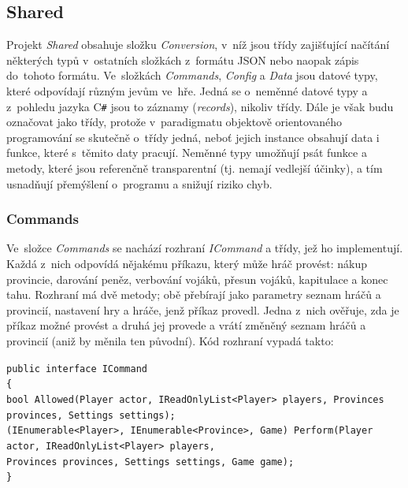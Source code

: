 \documentclass[a4paper,12pt]{article}
\def\CS{C\texttt{\#}}
\def\keyword #1{\color{keyword}#1\color{black}}
\begin{document}
\subsection{Shared}
Projekt \textit{Shared} obsahuje složku \textit{Conversion}, v~níž jsou třídy zajišťující načítání některých typů v~ostatních slož\-kách z~formátu JSON nebo naopak zápis do~tohoto formátu. Ve~slož\-kách \textit{Commands}, \textit{Config} a \textit{Data} jsou datové typy, které odpovídají různým jevům ve~hře. Jedná se o~neměnné datové typy a z~pohledu jazyka \CS{} jsou to záznamy (\textit{records}), nikoliv třídy. Dále je však budu označovat jako třídy, protože v~paradigmatu objektově orientovaného programování se skutečně o~třídy jedná, neboť jejich instance obsahují data i funkce, které s~těmito daty pracují. \cite{oop} Neměnné typy umožňují psát funkce a metody, které jsou referenčně transparentní (tj. nemají vedlejší účinky), a tím usnadňují přemýšlení o~programu a snižují riziko chyb. \cite{immutable1}\cite{immutable2}

\subsubsection{Commands}
Ve~složce \textit{Commands} se nachází rozhraní \textit{ICommand} a třídy, jež ho implementují. Každá z~nich odpovídá nějakému příkazu, který může hráč provést: nákup provincie, darování peněz, verbování vojáků, přesun vojáků, kapitulace a konec tahu. Rozhraní má dvě metody; obě přebírají jako parametry seznam hráčů a provincií, nastavení hry a hráče, jenž příkaz provedl. Jedna z~nich ověřuje, zda je příkaz možné provést a druhá jej provede a vrátí změněný seznam hráčů a provincií (aniž by měnila ten původní). Kód rozhraní vypadá takto:

\scriptsize\selectfont
\texttt{\keyword{public interface }ICommand}\\
\texttt{\{}\\
\hspace*{8mm}\texttt{\keyword{bool }Allowed(Player actor, IReadOnlyList<Player> players, Provinces provinces, Settings settings);}\\
\hspace*{8mm}\texttt{(IEnumerable<Player>, IEnumerable<Province>, Game) Perform(Player actor, IReadOnlyList<Player> players,}\\
\hspace*{48mm}\texttt{Provinces provinces, Settings settings, Game game);}\\
\texttt{\}}\normalsize
\end{document}
